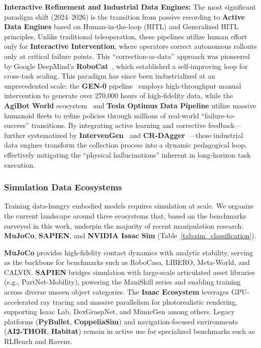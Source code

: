 \documentclass[acmsmall,screen,review,anonymous]{acmart}
\begin{document}
\textbf{Interactive Refinement and Industrial Data Engines:} 
The most significant paradigm shift (2024--2026) is the transition from passive recording to \textbf{Active Data Engines} based on Human-in-the-loop (HITL) and Generalized HITL principles. Unlike traditional teleoperation, these pipelines utilize human effort only for \textbf{Interactive Intervention}, where operators correct autonomous rollouts only at critical failure points. This ``correction-as-data'' approach was pioneered by Google DeepMind's \textbf{RoboCat}~\cite{bousmalis2023robocat}, which established a self-improving loop for cross-task scaling. This paradigm has since been industrialized at an unprecedented scale: the \textbf{GEN-0} pipeline~\cite{generalist2025gen0} employs high-throughput manual intervention to generate over 270,000 hours of high-fidelity data, while the \textbf{AgiBot World} ecosystem~\cite{agibot2025} and \textbf{Tesla Optimus Data Pipeline} utilize massive humanoid fleets to refine policies through millions of real-world ``failure-to-success'' transitions. By integrating active learning and corrective feedback---further systematized by \textbf{IntervenGen}~\cite{pinto2024intervengen} and \textbf{CR-DAgger}~\cite{crdagger2024}---these industrial data engines transform the collection process into a dynamic pedagogical loop, effectively mitigating the ``physical hallucinations'' inherent in long-horizon task execution.


\subsubsection{Simulation Data Ecosystems}\label{sec:simulation_infrastructure}

Training data-hungry embodied models requires simulation at scale. We organize the current landscape around three ecosystems that, based on the benchmarks surveyed in this work, underpin the majority of recent manipulation research: \textbf{MuJoCo}, \textbf{SAPIEN}, and \textbf{NVIDIA Isaac Sim} (Table~\ref{tab:sim_classification}).

\textbf{MuJoCo} provides high-fidelity contact dynamics with analytic stability, serving as the backbone for benchmarks such as RoboCasa, LIBERO, Meta-World, and CALVIN. \textbf{SAPIEN} bridges simulation with large-scale articulated asset libraries (e.g., PartNet-Mobility), powering the ManiSkill series and enabling training across diverse unseen object categories. The \textbf{Isaac Ecosystem} leverages GPU-accelerated ray tracing and massive parallelism for photorealistic rendering, supporting Isaac Lab, DexGraspNet, and MimicGen among others. Legacy platforms (\textbf{PyBullet}, \textbf{CoppeliaSim}) and navigation-focused environments (\textbf{AI2-THOR}, \textbf{Habitat}) remain in active use for specialized benchmarks such as RLBench and Ravens.
\end{document}

